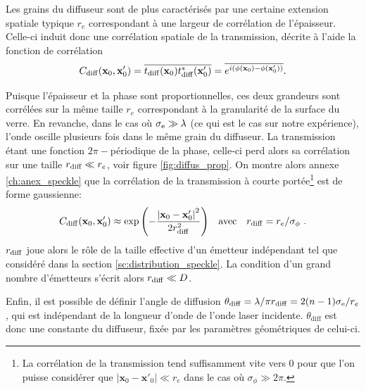 Les grains du diffuseur sont de plus caractérisés par une certaine extension spatiale typique $r_e$ correspondant à une largeur de corrélation de l'épaisseur. Celle-ci induit donc une corrélation spatiale de la transmission, décrite à l'aide la fonction de corrélation
\begin{equation}
C_{\mathrm{diff}}(\mathbf{x}_0,\mathbf{x}'_0)=\overline{t_{\mathrm{diff}}(\mathbf{x}_0)t_{\mathrm{diff}}^*(\mathbf{x}'_0)}=\overline{e^{i(\phi(\mathbf{x}_0)-\phi(\mathbf{x}'_0))}} { .}
\label{eq:correlation_diffuseur}
\end{equation}

Puisque l'épaisseur et la phase sont proportionnelles, ces deux grandeurs sont corrélées sur la même taille $r_e$ correspondant à la granularité de la surface du verre. En revanche, dans le cas où $\sigma_{\mathrm{e}} \gg \lambda$ (ce qui est le cas sur notre expérience), l'onde oscille plusieurs fois dans le même grain du diffuseur. La transmission étant une fonction $2\pi-$périodique de la phase, celle-ci perd alors sa corrélation sur une taille $r_{\mathrm{diff}} \ll r_e$, voir figure \ref{fig:diffus_prop}. On montre alors annexe \ref{ch:anex_speckle} que la corrélation de la transmission à courte portée\footnote{La corrélation de la transmission tend suffisamment vite vers 0 pour que l'on puisse considérer que $\left|\mathbf{x}_0-\mathbf{x}'_0 \right| \ll r_e$ dans le cas où $\sigma_\phi \gg 2\pi$.} est de forme gaussienne:
\begin{equation}
C_{\mathrm{diff}}(\mathbf{x}_0,\mathbf{x}'_0)\approx \exp{\left( -\frac{\left| \mathbf{x}_0 - \mathbf{x}'_0 \right| ^2}{2 r_{\mathrm{diff}}^2}\right) } \quad \text{avec} \quad r_{\mathrm{diff}}=r_e/\sigma_\phi \text{ .}
\label{eq:formule_Cdiff}
\end{equation}
$r_{\mathrm{diff}}$ joue alors le rôle de la taille effective d'un émetteur indépendant tel que considéré dans la section \ref{sc:distribution_speckle}. La condition d'un grand nombre d'émetteurs s'écrit alors $r_{\mathrm{diff}} \ll D$.

Enfin, il est possible de définir l'angle de diffusion $\theta_{\mathrm{diff}}=\lambda/\pi r_{\mathrm{diff}}=2(n-1) \sigma_{\mathrm{e}}/r_e$, qui est indépendant de la longueur d'onde de l'onde laser incidente. $\theta_{\mathrm{diff}}$ est donc une constante du diffuseur, fixée par les paramètres géométriques de celui-ci.











